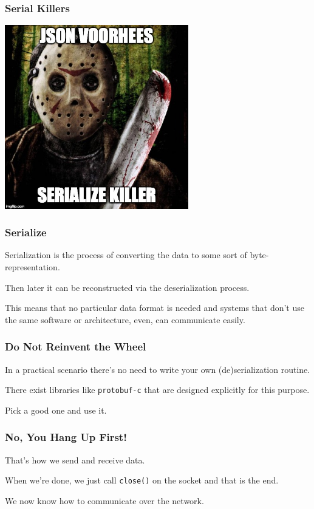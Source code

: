 \begin{frame}
	\frametitle{Serial Killers}

	\begin{center}
		\includegraphics[width=0.6\textwidth]{images/json-serialize-killer.jpg}
	\end{center}


\end{frame}



\begin{frame}
	\frametitle{Serialize}

	Serialization is the process of converting the data to some sort of byte-representation.

	Then later it can be reconstructed via the deserialization process.

	This means that no particular data format is needed and systems that don't use the same software or architecture, even, can communicate easily.

\end{frame}



\begin{frame}
	\frametitle{Do Not Reinvent the Wheel}

	In a practical scenario there's no need to write your own (de)serialization routine.

	There exist libraries like \texttt{protobuf-c} that are designed explicitly for this purpose.

	Pick a good one and use it.

\end{frame}



\begin{frame}
	\frametitle{No, You Hang Up First!}

	That's how we send and receive data.

	When we're done, we just call \texttt{close()} on the socket and that is the end.

	We now know how to communicate over the network.


\end{frame}



